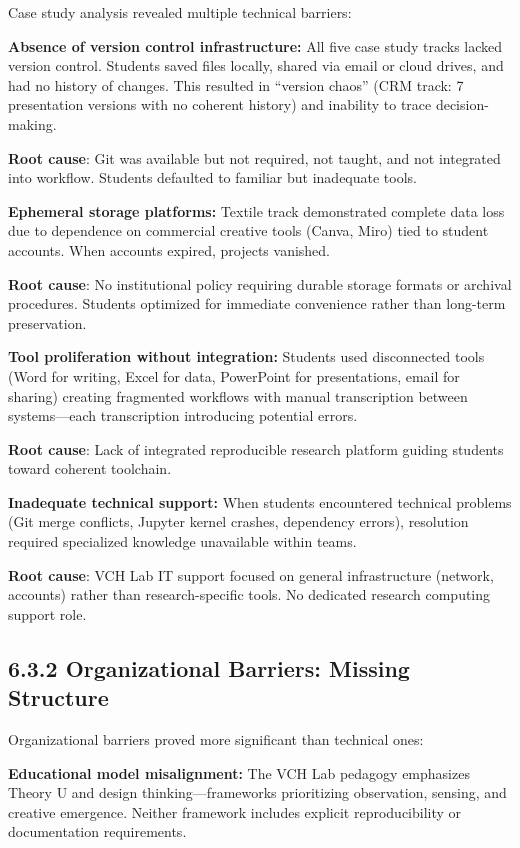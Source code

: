 \documentclass[
  oneside,
  open=any]{scrbook}
\begin{document}
Case study analysis revealed multiple technical barriers:

\textbf{Absence of version control infrastructure:} All five case study
tracks lacked version control. Students saved files locally, shared via
email or cloud drives, and had no history of changes. This resulted in
``version chaos'' (CRM track: 7 presentation versions with no coherent
history) and inability to trace decision-making.

\textbf{Root cause}: Git was available but not required, not taught, and
not integrated into workflow. Students defaulted to familiar but
inadequate tools.

\textbf{Ephemeral storage platforms:} Textile track demonstrated
complete data loss due to dependence on commercial creative tools
(Canva, Miro) tied to student accounts. When accounts expired, projects
vanished.

\textbf{Root cause}: No institutional policy requiring durable storage
formats or archival procedures. Students optimized for immediate
convenience rather than long-term preservation.

\textbf{Tool proliferation without integration:} Students used
disconnected tools (Word for writing, Excel for data, PowerPoint for
presentations, email for sharing) creating fragmented workflows with
manual transcription between systems---each transcription introducing
potential errors.

\textbf{Root cause}: Lack of integrated reproducible research platform
guiding students toward coherent toolchain.

\textbf{Inadequate technical support:} When students encountered
technical problems (Git merge conflicts, Jupyter kernel crashes,
dependency errors), resolution required specialized knowledge
unavailable within teams.

\textbf{Root cause}: VCH Lab IT support focused on general
infrastructure (network, accounts) rather than research-specific tools.
No dedicated research computing support role.

\subsection{6.3.2 Organizational Barriers: Missing
Structure}\label{organizational-barriers-missing-structure}

Organizational barriers proved more significant than technical ones:

\textbf{Educational model misalignment:} The VCH Lab pedagogy emphasizes
Theory U and design thinking---frameworks prioritizing observation,
sensing, and creative emergence. Neither framework includes explicit
reproducibility or documentation requirements.
\end{document}
